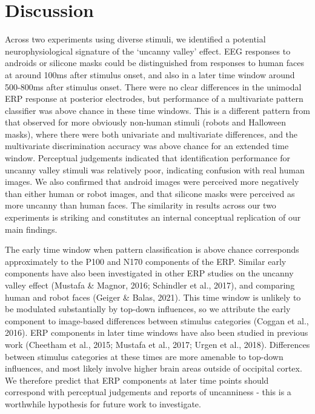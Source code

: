 \documentclass[
]{article}
\begin{document}
\section{Discussion}\label{discussion}

Across two experiments using diverse stimuli, we identified a potential neurophysiological signature of the `uncanny valley' effect. EEG responses to androids or silicone masks could be distinguished from responses to human faces at around 100ms after stimulus onset, and also in a later time window around 500-800ms after stimulus onset. There were no clear differences in the unimodal ERP response at posterior electrodes, but performance of a multivariate pattern classifier was above chance in these time windows. This is a different pattern from that observed for more obviously non-human stimuli (robots and Halloween masks), where there were both univariate and multivariate differences, and the multivariate discrimination accuracy was above chance for an extended time window. Perceptual judgements indicated that identification performance for uncanny valley stimuli was relatively poor, indicating confusion with real human images. We also confirmed that android images were perceived more negatively than either human or robot images, and that silicone masks were perceived as more uncanny than human faces. The similarity in results across our two experiments is striking and constitutes an internal conceptual replication of our main findings.

The early time window when pattern classification is above chance corresponds approximately to the P100 and N170 components of the ERP. Similar early components have also been investigated in other ERP studies on the uncanny valley effect (Mustafa \& Magnor, 2016; Schindler et al., 2017), and comparing human and robot faces (Geiger \& Balas, 2021). This time window is unlikely to be modulated substantially by top-down influences, so we attribute the early component to image-based differences between stimulus categories (Coggan et al., 2016). ERP components in later time windows have also been studied in previous work (Cheetham et al., 2015; Mustafa et al., 2017; Urgen et al., 2018). Differences between stimulus categories at these times are more amenable to top-down influences, and most likely involve higher brain areas outside of occipital cortex. We therefore predict that ERP components at later time points should correspond with perceptual judgements and reports of uncanniness - this is a worthwhile hypothesis for future work to investigate.
\end{document}
